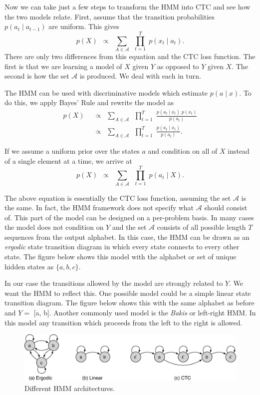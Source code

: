 Now we can take just a few steps to transform the HMM into CTC and see how
the two models relate. First, assume that the transition probabilities
$p(a_t \mid a_{t-1})$ are uniform. This gives
\[
p(X) \enspace \propto \enspace \sum_{A \in \mathcal{A}} \enspace \prod_{t=1}^T \; p(x_t \mid a_t).
\]
There are only two differences from this equation and the CTC loss function.
The first is that we are learning a model of $X$ given $Y$ as opposed to $Y$
given $X$. The second is how the set $\mathcal{A}$ is produced. We deal with
each in turn.

The HMM can be used with discriminative models which estimate $p(a \mid x)$.
To do this, we apply Bayes' Rule and rewrite the model as
\begin{align*}
p(X) \enspace &\propto \enspace \sum_{A \in \mathcal{A}} \enspace \prod_{t=1}^T \; \frac{p(a_t \mid x_t)\; p(x_t)}{p(a_t)} \\
    &\propto \enspace \sum_{A \in \mathcal{A}} \enspace \prod_{t=1}^T \; \frac{p(a_t \mid x_t)}{p(a_t)}.
\end{align*}

If we assume a uniform prior over the states $a$ and condition on all of $X$
instead of a single element at a time, we arrive at
\[
p(X) \enspace \propto \enspace \sum_{A \in \mathcal{A}} \enspace \prod_{t=1}^T \; p(a_t \mid X).
\]

The above equation is essentially the CTC loss function, assuming the set
$\mathcal{A}$ is the same. In fact, the HMM framework does not specify what
$\mathcal{A}$ should consist of. This part of the model can be designed on a
per-problem basis. In many cases the model does not condition on $Y$ and the
set $\mathcal{A}$ consists of all possible length $T$ sequences from the output
alphabet. In this case, the HMM can be drawn as an  {\it ergodic} state
transition diagram in which every state connects to every other state. The
figure below shows this model with the alphabet or set of unique hidden states
as $\{a, b, c\}$.

In our case the transitions allowed by the model are strongly related to $Y$.
We want the HMM to reflect this. One possible model could be a simple linear
state transition diagram. The figure below shows this with the same alphabet as
before and $Y =$ [a, b]. Another commonly used model is the {\it Bakis} or
left-right HMM. In this model any transition which proceeds from the left to
the right is allowed.

\begin{figure}
    \centering
    \includegraphics[width=\textwidth]{background/figures/hmm_types.pdf}
    \caption{Different HMM architectures.}
\end{figure}

